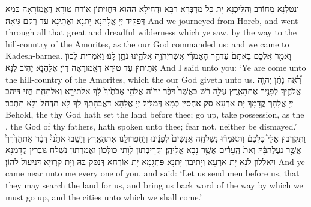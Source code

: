 {וּנְטַלְנָא מֵחוֹרֵב וְהַלֵּיכְנָא יָת כָּל מַדְבְּרָא רַבָּא וּדְחִילָא הַהוּא דַּחֲזֵיתוֹן אוֹרַח טוּרָא דֶּאֱמוֹרָאָה כְּמָא דְּפַקֵּיד יְיָ אֱלָהַנָא יָתַנָא וַאֲתֵינָא עַד רְקַם גֵּיאָה׃}
{And we journeyed from Horeb, and went through all that great and dreadful wilderness which ye saw, by the way to the hill-country of the Amorites, as the \lord\space our God commanded us; and we came to Kadesh-barnea.}{}
{וָאֹמַ֖ר אֲלֵכֶ֑ם בָּאתֶם֙ עַד\maqqaf הַ֣ר הָאֱמֹרִ֔י אֲשֶׁר\maqqaf יְהֹוָ֥ה אֱלֹהֵ֖ינוּ נֹתֵ֥ן לָֽנוּ׃}
{וַאֲמַרִית לְכוֹן אֲתֵיתוּן עַד טוּרָא דֶּאֱמוֹרָאָה דַּייָ אֱלָהַנָא יָהֵיב לַנָא׃}
{And I said unto you: ‘Ye are come unto the hill-country of the Amorites, which the \lord\space our God giveth unto us.}{}
{רְ֠אֵ֠ה נָתַ֨ן יְהֹוָ֧ה אֱלֹהֶ֛יךָ לְפָנֶ֖יךָ אֶת\maqqaf הָאָ֑רֶץ עֲלֵ֣ה רֵ֗שׁ כַּאֲשֶׁר֩ דִּבֶּ֨ר יְהֹוָ֜ה אֱלֹהֵ֤י אֲבֹתֶ֙יךָ֙ לָ֔ךְ אַל\maqqaf תִּירָ֖א וְאַל\maqqaf תֵּחָֽת׃}
{חֲזִי דִּיהַב יְיָ אֱלָהָךְ קֳדָמָךְ יָת אַרְעָא סַק אַחְסֵין כְּמָא דְּמַלֵּיל יְיָ אֱלָהָא דַּאֲבָהָתָךְ לָךְ לָא תִּדְחַל וְלָא תִתְּבַר׃}
{Behold, the \lord\space thy God hath set the land before thee; go up, take possession, as the \lord, the God of thy fathers, hath spoken unto thee; fear not, neither be dismayed.’}{}
{וַתִּקְרְב֣וּן אֵלַי֮ כֻּלְּכֶם֒ וַתֹּאמְר֗וּ נִשְׁלְחָ֤ה אֲנָשִׁים֙ לְפָנֵ֔ינוּ וְיַחְפְּרוּ\maqqaf לָ֖נוּ אֶת\maqqaf הָאָ֑רֶץ וְיָשִׁ֤בוּ אֹתָ֙נוּ֙ דָּבָ֔ר אֶת\maqqaf הַדֶּ֙רֶךְ֙ אֲשֶׁ֣ר נַעֲלֶה\maqqaf בָּ֔הּ וְאֵת֙ הֶֽעָרִ֔ים אֲשֶׁ֥ר נָבֹ֖א אֲלֵיהֶֽן׃}
{וּקְרֵיבְתּוּן לְוָתִי כּוּלְּכוֹן וַאֲמַרְתּוּן נִשְׁלַח גּוּבְרִין קֳדָמַנָא וִיאַלְּלוּן לַנָא יָת אַרְעָא וְיָתִיבוּן יָתַנָא פִּתְגָמָא יָת אוֹרְחָא דְּנִסַּק בַּהּ וְיָת קִרְוַיָּא דְּנֵיעוֹל לְהוֹן׃}
{And ye came near unto me every one of you, and said: ‘Let us send men before us, that they may search the land for us, and bring us back word of the way by which we must go up, and the cities unto which we shall come.’}{}
